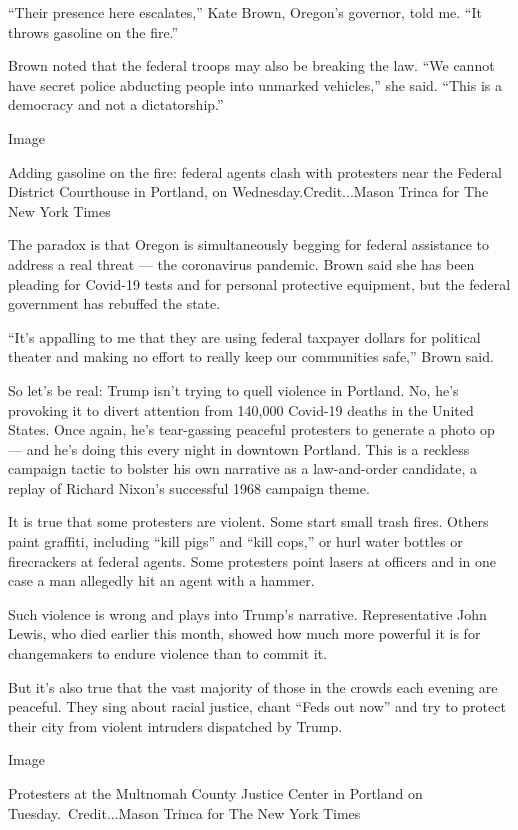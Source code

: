 ``Their presence here escalates,'' Kate Brown, Oregon's governor, told
me. ``It throws gasoline on the fire.''

Brown noted that the federal troops may also be breaking the law. ``We
cannot have secret police abducting people into unmarked vehicles,'' she
said. ``This is a democracy and not a dictatorship.''

Image

Adding gasoline on the fire: federal agents clash with protesters near
the Federal District Courthouse in Portland, on Wednesday.Credit...Mason
Trinca for The New York Times

The paradox is that Oregon is simultaneously begging for federal
assistance to address a real threat --- the coronavirus pandemic. Brown
said she has been pleading for Covid-19 tests and for personal
protective equipment, but the federal government has rebuffed the state.

``It's appalling to me that they are using federal taxpayer dollars for
political theater and making no effort to really keep our communities
safe,'' Brown said.

So let's be real: Trump isn't trying to quell violence in Portland. No,
he's provoking it to divert attention from 140,000 Covid-19 deaths in
the United States. Once again, he's tear-gassing peaceful protesters to
generate a photo op --- and he's doing this every night in downtown
Portland. This is a reckless campaign tactic to bolster his own
narrative as a law-and-order candidate, a replay of Richard Nixon's
successful 1968 campaign theme.

It is true that some protesters are violent. Some start small trash
fires. Others paint graffiti, including ``kill pigs'' and ``kill cops,''
or hurl water bottles or firecrackers at federal agents. Some protesters
point lasers at officers and in one case a man allegedly hit an agent
with a hammer.

Such violence is wrong and plays into Trump's narrative. Representative
John Lewis, who died earlier this month, showed how much more powerful
it is for changemakers to endure violence than to commit it.

But it's also true that the vast majority of those in the crowds each
evening are peaceful. They sing about racial justice, chant ``Feds out
now'' and try to protect their city from violent intruders dispatched by
Trump.

Image

Protesters at the Multnomah County Justice Center in Portland on
Tuesday.~Credit...Mason Trinca for The New York Times

